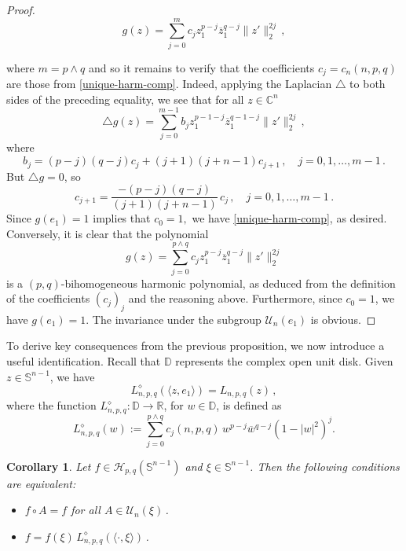\documentclass[12pt]{amsart}
\numberwithin{subsection}{section}
\newtheorem{corollary}[theorem]{Corollary}
\theoremstyle{definition}
\theoremstyle{remark}
\begin{document}
\begin{proof}
\[
g(z) = \sum_{j=0}^{m } c_j z_1^{p-j}\overline{z}_1^{q-j} \|z'\|_2^{2j}\,,
\]

where  $m=p \wedge q $ and so it remains to verify that  the coefficients  $c_j=c_n(n,p,q) $ are those
from \eqref{unique-harm-comp}.  Indeed,  applying the Laplacian  $\triangle $ to both sides of the
preceding equality, we see that for all  $z \in \mathbb{C}^n $
\[
\triangle g(z) =
\sum_{j=0}^{ m  -1} b_j z_1^{p-1- j}\overline{z}_1^{q-1-j} \|z'\|_2^{2j}\,,
\]
where
\[
b_j = (p-j) (q-j) c_j  + (j+1) (j+n-1) c_{j+1}\,, \quad  j= 0, 1, \dots, m-1\,.
\]
But  $\triangle g = 0 $, so
\[
c_{j+1} =  \frac{-(p-j) (q-j)}{(j+1) (j+n-1)}\, c_j \,, \quad  j= 0, 1, \dots, m-1\,.
\]
Since $g(e_1)=1$ implies that $c_0=1,$ we have \eqref{unique-harm-comp}, as desired.
Conversely, it is clear that the polynomial
\[
g(z) = \sum_{j=0}^{p \wedge q } c_j z_1^{p-j}\overline{z}_1^{q-j} \|z'\|_2^{2j}
\]
is a $(p,q) $-bihomogeneous harmonic polynomial, as deduced from the definition of the coefficients  $(c_j)_j$
and the reasoning above. Furthermore, since  $c_0=1 $, we have  $g(e_1)=1 $. The invariance under the subgroup
$\mathcal{U}_n(e_1) $ is obvious.
\end{proof}

To derive key consequences from the previous proposition, we now introduce a useful identification. Recall that
$\mathbb{D} $ represents the complex open unit disk. Given  $z \in \mathbb{S}^{n-1}$, we have
\[
L_{n,p,q}^{\diamond} (\langle z, e_1 \rangle) =  L_{n,p,q}(z)\,,
\]
where the function  $L_{n,p,q}^{\diamond}: \mathbb{D} \to \mathbb{R} $, for  $w \in \mathbb{D} $, is defined as
\begin{equation} \label{repro}
  L_{n,p,q}^{\diamond}(w) :=
    \sum_{j=0}^{p\wedge q} c_j(n,p,q) \,w^{p-j} \overline{w}^{q-j}
    (1 - |w|^2)^{j}.
\end{equation}

  \smallskip

\begin{corollary} \label{lemma1-comp}
Let  $f \in \mathcal{H}_{p,q}(\mathbb{S}^{n-1}) $ and  $\xi \in \mathbb{S}^{n-1} $. Then the following 
conditions are equivalent:
\begin{itemize}
\item[{\rm(1)}]
$f \circ A = f $ for all  $A \in \mathcal{U}_n(\xi)$\,.
\item[{\rm(2)}]
$f = f(\xi)\, L^{\diamond}_{n,p,q}(\langle\pmb{\cdot},\xi \rangle )$\,.
\end{itemize}
\end{corollary}
\end{document}
